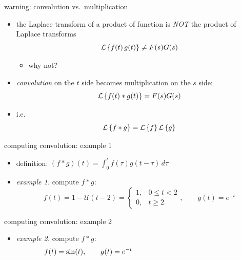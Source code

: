 \documentclass[urlcolor=blue,dvipsnames]{beamer}
\begin{document}
\begin{frame}{warning: convolution vs.~multiplication}

\begin{itemize}
\item the Laplace transform of a product of function is \alert{\emph{NOT}} the product of Laplace transforms
    $$\mathcal{L}\left\{f(t)\, g(t)\right\} \neq F(s) G(s)$$

\vspace{-3mm}
    \begin{itemize}
    \item why not?
    \end{itemize}

\bigskip\bigskip\bigskip

\item \emph{convolution} on the $t$ side becomes multiplication on the $s$ side:
    $$\mathcal{L}\left\{f(t)\ast g(t)\right\} = F(s) G(s)$$
\item i.e.
    $$\mathcal{L}\left\{f\ast g\right\} = \mathcal{L}\left\{f\right\} \mathcal{L}\left\{g\right\}$$
\end{itemize}
\end{frame}


\begin{frame}{computing convolution: example 1}

\begin{itemize}
\item definition: \qquad $(f \ast g)(t) = \int_0^t f(\tau) g(t-\tau)\,d\tau$
\item \emph{example 1.} compute $f\ast g$:
  $$f(t) = 1-\mathcal{U}(t-2) = \begin{cases} 1, & 0\le t < 2 \\ 0, & t\ge 2 \end{cases}, \qquad g(t) = e^{-t}$$
\end{itemize}

\vspace{45mm}
\end{frame}


\begin{frame}{computing convolution: example 2}

\begin{itemize}
\item \emph{example 2.} compute $f\ast g$:
  $$f(t) = \sin(t), \qquad g(t) = e^{-t} \hspace{50mm}$$
\end{itemize}

\vspace{60mm}
\end{frame}
\end{document}
